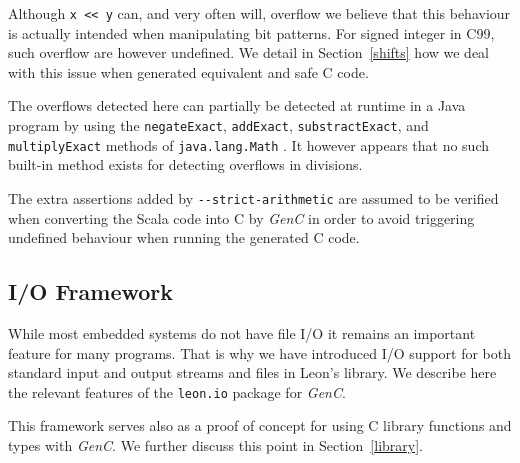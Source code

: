 \documentclass[a4paper,twoside]{article}
\newcommand{\Inline}[1]{\lstinline[basicstyle=\ttfamily]|#1|}
\newcommand{\InlineS}[1]{\lstinline[language=Leon]|#1|}
\newcommand{\GenC}{\emph{GenC}\xspace}
\newcommand{\RefSec}[1]{Section~\ref{#1}}
\begin{document}
Although \InlineS{x << y} can, and very often will, overflow we believe that
this behaviour is actually intended when manipulating bit patterns. For signed
integer in C99, such overflow are however undefined. We detail in
\RefSec{shifts} how we deal with this issue when generated equivalent and safe C
code.

The overflows detected here can partially be detected at runtime in a Java
program by using the \InlineS{negateExact}, \InlineS{addExact},
\InlineS{substractExact}, and \InlineS{multiplyExact} methods of
\InlineS{java.lang.Math} \cite{java8math}. It however appears that no such
built-in method exists for detecting overflows in divisions.

The extra assertions added by \Inline{--strict-arithmetic} are assumed to be
verified when converting the Scala code into C by \GenC in order to avoid
triggering undefined behaviour when running the generated C code.


\subsection{I/O Framework}
\label{io_framework}

While most embedded systems do not have file I/O it remains an important feature
for many programs. That is why we have introduced I/O support for both standard
input and output streams and files in Leon's library. We describe here the
relevant features of the \InlineS{leon.io} package for \GenC.

This framework serves also as a proof of concept for using C library functions
and types with \GenC. We further discuss this point in \RefSec{library}.
\end{document}
